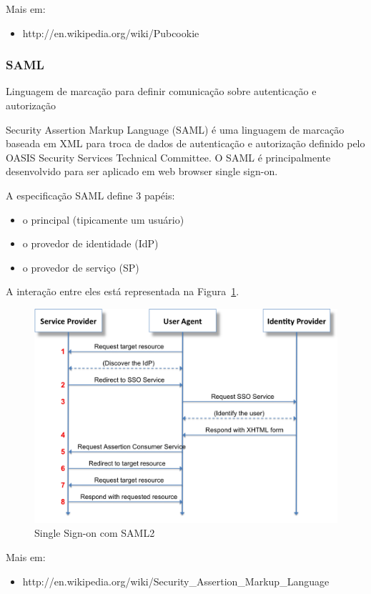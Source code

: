 \documentclass[11pt]{article}
\begin{document}
Mais em:
\begin{itemize}
  \item{http://en.wikipedia.org/wiki/Pubcookie}
\end{itemize}

\subsubsection{SAML}

Linguagem de marcação para definir comunicação sobre autenticação e autorização

Security Assertion Markup Language (SAML) é uma linguagem de marcação baseada
em XML para troca de dados de autenticação e autorização definido pelo OASIS
Security Services Technical Committee. O SAML é principalmente desenvolvido
para ser aplicado em web browser single sign-on.

A especificação SAML define 3 papéis:
\begin{itemize}
  \item{o principal (tipicamente um usuário)}
  \item{o provedor de identidade (IdP)}
  \item{o provedor de serviço (SP)}
\end{itemize}

A interação entre eles está representada na Figura~\ref{fig:saml2}.

\begin{figure}[h]
\center
\includegraphics[scale=0.5]{saml2.png}
\caption{Single Sign-on com SAML2}
\label{fig:saml2}
\end{figure}

Mais em:
\begin{itemize}
  \item{http://en.wikipedia.org/wiki/Security\_Assertion\_Markup\_Language}
\end{itemize}
\end{document}
